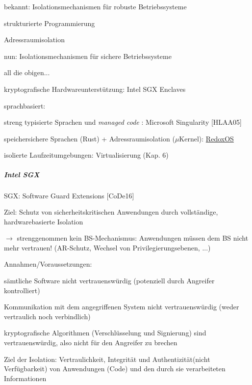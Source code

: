\documentclass[a4paper]{article}
\begin{document}
\begin{multicols}{3}
    \begin{itemize*}
        \item
        bekannt: Isolationsmechanismen für robuste Betriebssysteme
        \begin{itemize*}
            \item strukturierte Programmierung
            \item Adressraumisolation
        \end{itemize*}
        \item
        nun: Isolationsmechanismen für sichere Betriebssysteme
        \begin{itemize*}
            \item all die obigen...
            \item kryptografische Hardwareunterstützung: Intel SGX Enclaves
            \item sprachbasiert: \begin{itemize*} \item   streng typisierte Sprachen und \emph{managed code} : Microsoft   Singularity {[}HLAA05{]} \item   speichersichere Sprachen (Rust) + Adressraumisolation ($\mu$Kernel):   \href{https://www.redox-os.org/}{RedoxOS} \end{itemize*}
            \item isolierte Laufzeitumgebungen: Virtualisierung (Kap. 6)
        \end{itemize*}
    \end{itemize*}


    \subparagraph{Intel SGX}

    \begin{itemize*}
        \item
        SGX: Software Guard Extensions {[}CoDe16{]}
        \item
        Ziel: Schutz von sicherheitskritischen Anwendungen durch vollständige,
        hardwarebasierte Isolation
        \item
        $\rightarrow$  strenggenommen kein BS-Mechanismus:
        Anwendungen müssen dem BS nicht mehr vertrauen! (AR-Schutz, Wechsel
        von Privilegierungsebenen, ...)
        \item
        Annahmen/Voraussetzungen:
        \begin{enumerate*}

            \item sämtliche Software nicht vertrauenswürdig (potenziell durch Angreifer kontrolliert)
            \item Kommunikation mit dem angegriffenen System nicht vertrauenswürdig (weder vertraulich noch verbindlich)
            \item kryptografische Algorithmen (Verschlüsselung und Signierung) sind vertrauenswürdig, also nicht für den Angreifer zu brechen
            \item Ziel der Isolation: Vertraulichkeit, Integrität und Authentizität(nicht Verfügbarkeit) von Anwendungen (Code) und den durch sie verarbeiteten Informationen
        \end{enumerate*}
    \end{itemize*}



\end{multicols}
\end{document}
